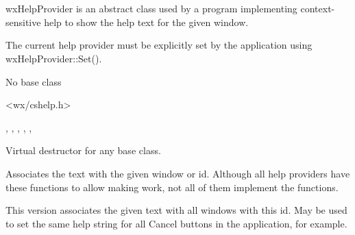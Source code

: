 \section{}\label{wxhelpprovider}

wxHelpProvider is an abstract class used by a program implementing context-sensitive help to
show the help text for the given window.

The current help provider must be explicitly set by the application using
wxHelpProvider::Set().


No base class


<wx/cshelp.h>


, , 
, , 
, 



\label{wxhelpproviderdtor}


Virtual destructor for any base class.


\label{wxhelpprovideraddhelp}


Associates the text with the given window or id. Although all help
providers have these functions to allow making  
work, not all of them implement the functions.


This version associates the given text with all windows with this id.
May be used to set the same help string for all Cancel buttons in
the application, for example.


\label{wxhelpproviderget}


